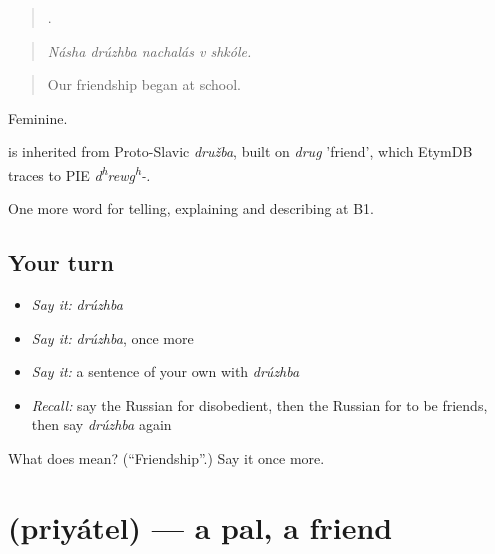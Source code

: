 \begin{quote}
    .
\end{quote}

\begin{quote}
\emph{Násha drúzhba nachalás v shkóle.}
\end{quote}

\begin{quote}
Our friendship began at school.
\end{quote}

Feminine.

\begin{cousinweb}
\emph{} is inherited from Proto-Slavic \emph{družba}, built on \emph{drug} 'friend', which EtymDB traces to PIE \emph{d\textsuperscript{h}rewg\textsuperscript{h}-.}
\end{cousinweb}

\begin{grammarlens}[title={What you've built}]
One more word for telling, explaining and describing at B1.
\end{grammarlens}

\subsection*{Your turn}
\begin{itemize}
\raggedright
  \item \emph{Say it:} \emph{drúzhba}
  \item \emph{Say it:} \emph{drúzhba}, once more
  \item \emph{Say it:} a sentence of your own with \emph{drúzhba}
  \item \emph{Recall:} say the Russian for disobedient, then the Russian for to be friends, then say \emph{drúzhba} again
\end{itemize}

\begin{tcolorbox}[breakable,colback=teal!4,colframe=teal!35!black,title={Before you move on}]
What does  mean? (\textquotedblleft{}Friendship\textquotedblright{}.) Say it once more.
\end{tcolorbox}
\section[\texorpdfstring{\ru{приятель} (priyátel)}{приятель (priyátel)}]{ (priyátel) — a pal, a friend}

\label{lesson:RU-C498-priyatel}




